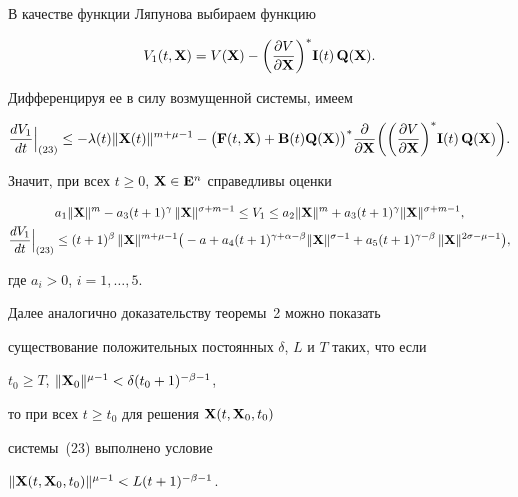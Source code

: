 \begin{pf}


В качестве функции Ляпунова выбираем функцию


$$


V_1(t, \bold X)=V(\bold X)-\bigg(\frac{\partial V}{\partial \bold X}


\bigg)^* \bold I(t) \, \bold Q(\bold X).


$$


Дифференцируя ее в силу возмущенной системы, имеем


$$


\frac{dV_1}{dt} \Big|_{(23)} \leq -\lambda(t) \|\bold X(t)\|^{m+\mu-1}-


\big(\bold F(t, \bold X)+\bold B(t) \bold Q(\bold X)\big)^*


\frac{\partial }{\partial \bold X} \bigg(


\bigg(\frac{\partial V}{\partial \bold X}


\bigg)^* \bold I(t) \, \bold Q(\bold X)\bigg).


$$


Значит, при всех $t\geq 0$, $\bold X\in \bold E^n$ справедливы оценки


\begin{gather*}


a_1 \|\bold X\|^m- a_3  (t+1)^\gamma\, \|\bold X\|^{\sigma+m-1} \leq


V_1 \leq a_2  \|\bold X\|^m+


a_3  (t+1)^\gamma \|\bold X\|^{\sigma+m-1}, \\


%


\frac{dV_1}{dt} \Big|_{(23)} \leq (t+1)^\beta \, \|\bold X\|^{m+\mu-1}


\big(-a+a_4  (t+1)^{\gamma+\alpha-\beta} \|\bold X\|^{\sigma-1}+


a_5  (t+1)^{\gamma-\beta} \, \|\bold X\|^{2\sigma-\mu-1} \big),


\end{gather*}


где $a_i>0$, $i=1,\dotsc,5$.





Далее аналогично доказательству теоремы~2 можно показать


существование положительных постоянных $\delta$, $L$ и $T$ таких, что если


$t_0\geq T$, $\|\bold X_0\|^{\mu-1} < \delta (t_0+1)^{-\beta-1}$,


то при всех $t\geq t_0$ для решения $\bold X(t,\bold X_0,t_0)$


системы~(23) выполнено условие


$\|\bold X(t,\bold X_0,t_0)\|^{\mu-1}<L  (t+1)^{-\beta-1}$.


\end{pf}





